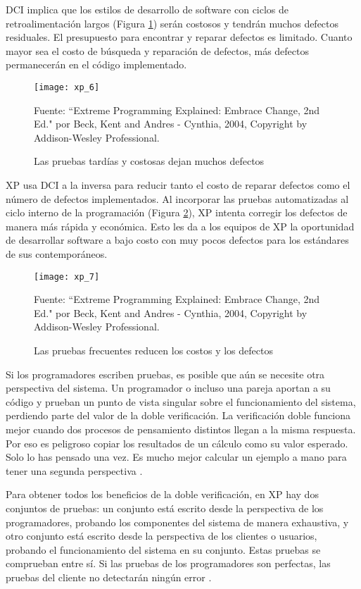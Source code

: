 \begin{spacing}{1.5}
				DCI implica que los estilos de desarrollo de software con ciclos de retroalimentación largos (Figura \ref{figure:chaperII_7}) serán costosos y tendrán muchos defectos residuales. El presupuesto para encontrar y reparar defectos es limitado. Cuanto mayor sea el costo de búsqueda y reparación de defectos, más defectos permanecerán en el código implementado.
				
				\begin{figure}[H]
					\centering
					\texttt{[image: xp\_6]}
					\caption {\centering \small{Las pruebas tardías y costosas dejan muchos defectos}} \label{figure:chaperII_7}
					\small {Fuente: ``Extreme Programming Explained: Embrace Change, 2nd Ed." por Beck, Kent and Andres - Cynthia, 2004, Copyright by Addison-Wesley Professional.}
				\end{figure}
			
			XP usa DCI a la inversa para reducir tanto el costo de reparar defectos como el número de defectos implementados. Al incorporar las pruebas automatizadas al ciclo interno de la programación (Figura \ref{figure:chaperII_8}), XP intenta corregir los defectos de manera más rápida y económica. Esto les da a los equipos de XP la oportunidad de desarrollar software a bajo costo con muy pocos defectos para los estándares de sus contemporáneos.
			
			\begin{figure}[H]
				\centering
				\texttt{[image: xp\_7]}
				\caption {\centering \small{Las pruebas frecuentes reducen los costos y los defectos}} \label{figure:chaperII_8}
				\small {Fuente: ``Extreme Programming Explained: Embrace Change, 2nd Ed." por Beck, Kent and Andres - Cynthia, 2004, Copyright by Addison-Wesley Professional.}
			\end{figure}
		
		Si los programadores escriben pruebas, es posible que aún se necesite otra perspectiva del sistema. Un programador o incluso una pareja aportan a su código y prueban un punto de vista singular sobre el funcionamiento del sistema, perdiendo parte del valor de la doble verificación. La verificación doble funciona mejor cuando dos procesos de pensamiento distintos llegan a la misma respuesta. Por eso es peligroso copiar los resultados de un cálculo como su valor esperado. Solo lo has pensado una vez. Es mucho mejor calcular un ejemplo a mano para tener una segunda perspectiva \cite{chap2_extreme_programming}.
		
		Para obtener todos los beneficios de la doble verificación, en XP hay dos conjuntos de pruebas: un conjunto está escrito desde la perspectiva de los programadores, probando los componentes del sistema de manera exhaustiva, y otro conjunto está escrito desde la perspectiva de los clientes o usuarios, probando el funcionamiento del sistema en su conjunto. Estas pruebas se comprueban entre sí. Si las pruebas de los programadores son perfectas, las pruebas del cliente no detectarán ningún error \cite{chap2_extreme_programming}.
		

\end{spacing}

